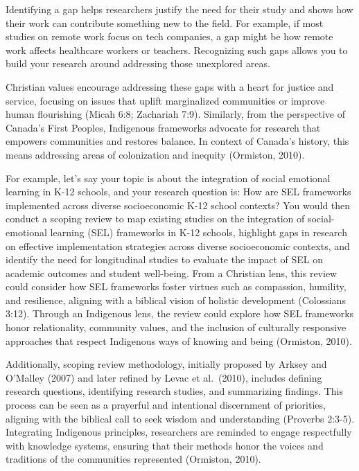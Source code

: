 \documentclass[
  letterpaper,
  DIV=11,
  numbers=noendperiod]{scrreprt}
\begin{document}
Identifying a gap helps researchers justify the need for their study and
shows how their work can contribute something new to the field. For
example, if most studies on remote work focus on tech companies, a gap
might be how remote work affects healthcare workers or teachers.
Recognizing such gaps allows you to build your research around
addressing those unexplored areas.

Christian values encourage addressing these gaps with a heart for
justice and service, focusing on issues that uplift marginalized
communities or improve human flourishing (Micah 6:8; Zachariah 7:9).
Similarly, from the perspective of Canada's First Peoples, Indigenous
frameworks advocate for research that empowers communities and restores
balance. In context of Canada's history, this means addressing areas of
colonization and inequity (Ormiston, 2010).

For example, let's say your topic is about the integration of social
emotional learning in K-12 schools, and your research question is: How
are SEL frameworks implemented across diverse socioeconomic K-12 school
contexts? You would then conduct a scoping review to map existing
studies on the integration of social-emotional learning (SEL) frameworks
in K-12 schools, highlight gaps in research on effective implementation
strategies across diverse socioeconomic contexts, and identify the need
for longitudinal studies to evaluate the impact of SEL on academic
outcomes and student well-being. From a Christian lens, this review
could consider how SEL frameworks foster virtues such as compassion,
humility, and resilience, aligning with a biblical vision of holistic
development (Colossians 3:12). Through an Indigenous lens, the review
could explore how SEL frameworks honor relationality, community values,
and the inclusion of culturally responsive approaches that respect
Indigenous ways of knowing and being (Ormiston, 2010).

Additionally, scoping review methodology, initially proposed by Arksey
and O'Malley (2007) and later refined by Levac et al.~(2010), includes
defining research questions, identifying research studies, and
summarizing findings. This process can be seen as a prayerful and
intentional discernment of priorities, aligning with the biblical call
to seek wisdom and understanding (Proverbs 2:3-5). Integrating
Indigenous principles, researchers are reminded to engage respectfully
with knowledge systems, ensuring that their methods honor the voices and
traditions of the communities represented (Ormiston, 2010).
\end{document}
